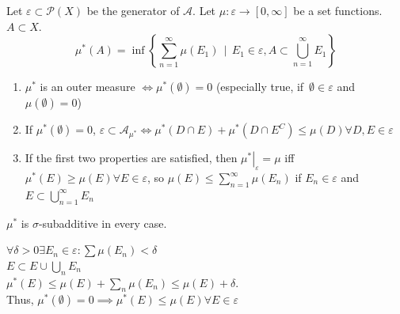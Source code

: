 \documentclass[a4paper]{article}
\numberwithin{lecref}{section}
\theoremstyle{break}
\newcommand{\SetDef}[2]{\left\{#1\,\mid\,#2\right\}}
\begin{document}
\begin{theorem}
  Let $\varepsilon \subset \mathcal P(X)$ be the generator of $\mathcal A$.
  Let $\mu: \varepsilon \to [0, \infty]$ be a set functions. $A \subset X$.
  \[ \mu^*(A) = \inf\SetDef{\sum_{n=1}^\infty \mu(E_1)}{E_1 \in \varepsilon, A \subset \bigcup_{n=1}^\infty E_1} \]
  \begin{enumerate}
    \item $\mu^*$ is an outer measure $\iff \mu^*(\emptyset) = 0$ (especially true, if $\, \emptyset \in \varepsilon$ and $\mu(\emptyset) = 0$)
    \item If $\mu^*(\emptyset) = 0$, $\varepsilon \subset \mathcal A_{\mu^*} \iff \mu^*(D \cap E) + \mu^*(D \cap E^C) \leq \mu(D) \forall D, E \in \varepsilon$
    \item If the first two properties are satisfied, then $\left.\mu^*\right|_\varepsilon = \mu$ iff $\mu^*(E) \geq \mu(E) \forall E \in \varepsilon$, so $\mu(E) \leq \sum_{n=1}^\infty \mu(E_n)$ if $E_n \in \varepsilon$ and $E \subset \bigcup_{n=1}^\infty E_n$
  \end{enumerate}
\end{theorem}

$\mu^*$ is $\sigma$-subadditive in every case.

$\forall \delta > 0 \exists E_n \in \varepsilon: \sum \mu(E_n) < \delta$ \\
$E \subset E \cup \bigcup_n E_n$ \\
$\mu^*(E) \leq \mu(E) + \sum_n \mu(E_n) \leq \mu(E) + \delta$. \\
Thus, $\mu^*(\emptyset) = 0 \implies \mu^*(E) \leq \mu(E) \forall E \in \varepsilon$
\end{document}
